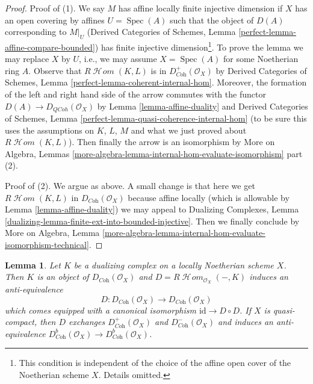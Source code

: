 \documentclass{stacks-project}
\theoremstyle{plain}
\newtheorem{lemma}[subsection]{Lemma}
\theoremstyle{definition}
\theoremstyle{remark}
\numberwithin{equation}{subsection}
\def\Spec{\mathop{\mathrm{Spec}}}
\def\SheafHom{\mathop{\mathcal{H}\!\mathit{om}}\nolimits}
\def\QCoh{\mathit{QCoh}}
\begin{document}
\begin{proof}
Proof of (1). We say $M$ has affine locally finite injective dimension
if $X$ has an open covering by affines $U = \Spec(A)$ such that the object
of $D(A)$ corresponding to $M|_U$ (Derived Categories of Schemes, Lemma
\ref{perfect-lemma-affine-compare-bounded})
has finite injective dimension\footnote{This condition is independent of the
choice of the affine open cover of the Noetherian scheme $X$.
Details omitted.}. To prove the lemma we may
replace $X$ by $U$, i.e., we may assume $X = \Spec(A)$
for some Noetherian ring $A$. Observe that
$R\SheafHom(K, L)$ is in $D^+_{\textit{Coh}}(\mathcal{O}_X)$ by
Derived Categories of Schemes, Lemma
\ref{perfect-lemma-coherent-internal-hom}.
Moreover, the formation of the left and right hand side
of the arrow commutes with the functor $D(A) \to D_\QCoh(\mathcal{O}_X)$ by
Lemma \ref{lemma-affine-duality} and
Derived Categories of Schemes, Lemma
\ref{perfect-lemma-quasi-coherence-internal-hom}
(to be sure this uses the assumptions on $K$, $L$, $M$ and what we just
proved about $R\SheafHom(K, L)$).
Then finally the arrow is an isomorphism by
More on Algebra, Lemmas
\ref{more-algebra-lemma-internal-hom-evaluate-isomorphism} part (2).

\medskip\noindent
Proof of (2). We argue as above. A small change is that here we get
$R\SheafHom(K, L)$ in $D_{\textit{Coh}}(\mathcal{O}_X)$ because
affine locally (which is allowable by Lemma \ref{lemma-affine-duality})
we may appeal to Dualizing Complexes, Lemma
\ref{dualizing-lemma-finite-ext-into-bounded-injective}.
Then we finally conclude by
More on Algebra, Lemma
\ref{more-algebra-lemma-internal-hom-evaluate-isomorphism-technical}.
\end{proof}

\begin{lemma}
\label{lemma-dualizing-schemes}
Let $K$ be a dualizing complex on a locally Noetherian scheme $X$.
Then $K$ is an object of $D_{\textit{Coh}}(\mathcal{O}_X)$
and $D = R\SheafHom_{\mathcal{O}_X}(-, K)$ induces an anti-equivalence
$$
D :
D_{\textit{Coh}}(\mathcal{O}_X)
\longrightarrow
D_{\textit{Coh}}(\mathcal{O}_X)
$$
which comes equipped with a canonical isomorphism
$\text{id} \to D \circ D$. If $X$ is quasi-compact, then
$D$ exchanges $D^+_{\textit{Coh}}(\mathcal{O}_X)$ and
$D^-_{\textit{Coh}}(\mathcal{O}_X)$ and induces an anti-equivalence
$D^b_{\textit{Coh}}(\mathcal{O}_X) \to D^b_{\textit{Coh}}(\mathcal{O}_X)$.
\end{lemma}
\end{document}
